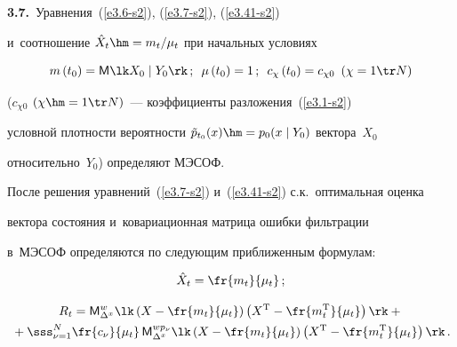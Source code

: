 \textbf{3.7.}\ Уравнения~(\ref{e3.6-s2}), (\ref{e3.7-s2}), (\ref{e3.41-s2}) 

и~соотношение $\hat X_t \hm= m_t/\mu_t$ при начальных условиях

\begin{equation}

m\left(t_0\right) ={\sf M}\lk X_0\mid Y_0\rk\,;\enskip 

\mu\left(t_0\right) = 1\,;\enskip 

c_\chi\left(t_0\right) =c_{\chi 0}\enskip (\chi =1\tr     N)

\label{e3.42-s2}

    \end{equation}

($c_{\chi 0}$ $(\chi\hm=1\tr N)$~--- коэффициенты разложения~(\ref{e3.1-s2}) 

условной плотности вероятности $\tilde p_{t_0} (x) \hm= p_0 (x\mid Y_0)$ вектора~$X_0$ 

относительно~$Y_0$) определяют МЭСОФ.

После решения уравнений~(\ref{e3.7-s2}) и~(\ref{e3.41-s2})  с.к.\ оптимальная оценка

вектора состояния и~ковариационная матрица ошибки фильтрации 

в~МЭСОФ определяются по следующим приближенным формулам:

\begin{equation}

 \hat X_t = \displaystyle\fr{m_t}{\mu_t}\,;

 \label{e3.43-s2}

 \end{equation}

 

\noindent

 \begin{multline}

 R_t = \displaystyle {\sf M}_{\Delta^x}^{w} \lk\left(

    X-\fr{m_t}{\mu_t}\right) \left( X^{\mathrm{T}}-\fr{m_t^{\mathrm{T}}}{\mu_t}\right)

    \rk +{}\\

    {}+

\sss_{\nu=1}^N \fr{c_\nu}{\mu_t}\, {\sf M}_{\Delta^x}^{w p_\nu}\lk

    \left( X-\fr{m_t}{\mu_t}\right) \left( X^{\mathrm{T}}-

    \fr{m_t^{\mathrm{T}}}{\mu_t}\right) \rk\,.

    \label{e3.44-s2}

    \end{multline}



